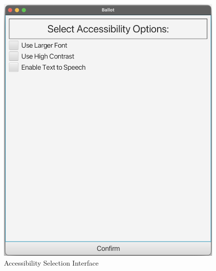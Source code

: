 \documentclass{article}
\begin{document}
\begin{figure}[h]
  \centering
  \begin{minipage}[b]{0.4\textwidth}
    \includegraphics[width=\textwidth]{docs/sad/figures/accessibility.png}
    \caption{Accessibility Selection Interface}
    \label{fig:accessibility}
  \end{minipage}
  \hfill
  \begin{minipage}[b]{0.4\textwidth}

\end{minipage}
\end{figure}
\end{document}
